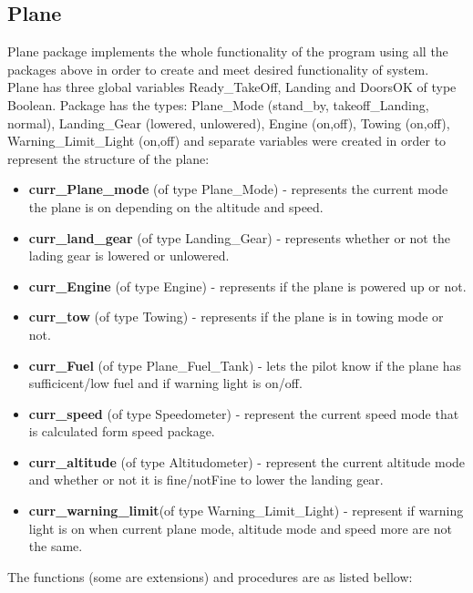 \documentclass{llncs}
\begin{document}
\subsection{Plane}
Plane package implements the whole functionality of the program using all the packages above in order to create and meet desired functionality of system. \\Plane has three global variables Ready\_TakeOff, Landing and DoorsOK of type Boolean. Package  has the types: Plane\_Mode (stand\_by, takeoff\_Landing, normal), Landing\_Gear (lowered, unlowered), Engine (on,off), Towing (on,off), Warning\_Limit\_Light (on,off) and separate variables were created in order to represent the structure of the plane:
\begin{itemize}
\item \textbf{curr\_Plane\_mode} (of type Plane\_Mode) - represents the current mode the plane is on depending on the altitude and speed.
\item \textbf{curr\_land\_gear} (of type Landing\_Gear) - represents whether or not the lading gear is lowered or unlowered. 
\item \textbf{curr\_Engine} (of type Engine) - represents if the plane is powered up or not.
\item \textbf{curr\_tow} (of type Towing) - represents if the plane is in towing mode or not. 
\item \textbf{curr\_Fuel} (of type Plane\_Fuel\_Tank) -  lets the pilot know if the plane has sufficicent/low fuel and if warning light is on/off.
\item \textbf{curr\_speed} (of type Speedometer) - represent the current speed mode that is calculated form speed package. 
\item \textbf{curr\_altitude} (of type Altitudometer) - represent the current altitude mode and whether or not it is fine/notFine to lower the landing gear.
\item \textbf{curr\_warning\_limit}(of type Warning\_Limit\_Light) - represent if warning light is on when current plane mode, altitude mode and speed more are not the same. 
\end{itemize}
The functions (some are extensions) and procedures are as listed bellow: 
\end{document}
